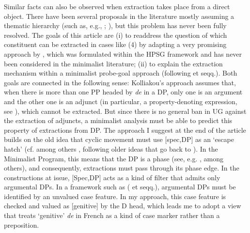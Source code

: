 \documentclass[output=paper]{langsci/langscibook}
\begin{document}
\ea%
    \label{ex:mensch:4}
    \z
\z

Similar facts can also be observed when extraction takes place from a direct object. There have been several proposals in the literature mostly assuming a thematic hierarchy (such as, e.g., \citealt{Pollock1989}; \citealt{Godard1992}), but this problem has never been fully resolved. The goals of this article are (i) to readdress the question of which constituent can be extracted in cases like (4) by adapting a very promising approach by \citet{Kolliakou1999}, which was formulated within the HPSG framework and has never been considered in the minimalist literature; (ii) to explain the extraction mechanism within a minimalist probe-goal approach (following \citealt{Chomsky2000} et seqq.). Both goals are connected in the following sense: Kolliakou’s approach assumes that, when there is more than one PP headed by \textit{de} in a DP, only one is an argument and the other one is an adjunct (in particular, a property-denoting expression, see \citealt{Chierchia1982,Chierchia1985}), which cannot be extracted. But since there is no general ban in UG against the extraction of adjuncts, a minimalist analysis must be able to predict this property of extractions from DP. The approach I suggest at the end of the article builds on the old idea that cyclic movement must use [spec,DP] as an ‘escape hatch’ (cf. among others \citealt{Gavruseva2000}, following older ideas that go back to \citealt{Cinque1980}). In the Minimalist Program, this means that the DP is a phase (see, e.g. \citealt{Heck2008,Heck2009}, among others), and consequently, extractions must pass through its phase edge. In the constructions at issue, [Spec,DP] acts as a kind of filter that admits only argumental DPs. In a framework such as \citeauthor{Chomsky2000} (\citeyear{Chomsky2000} et seqq.), argumental DPs must be identified by an unvalued case feature. In my approach, this case feature is checked and valued as [genitive] by the D head, which leads me to adopt a view that treats ‘genitive’ \textit{de} in French as a kind of case marker rather than a preposition.
\end{document}
